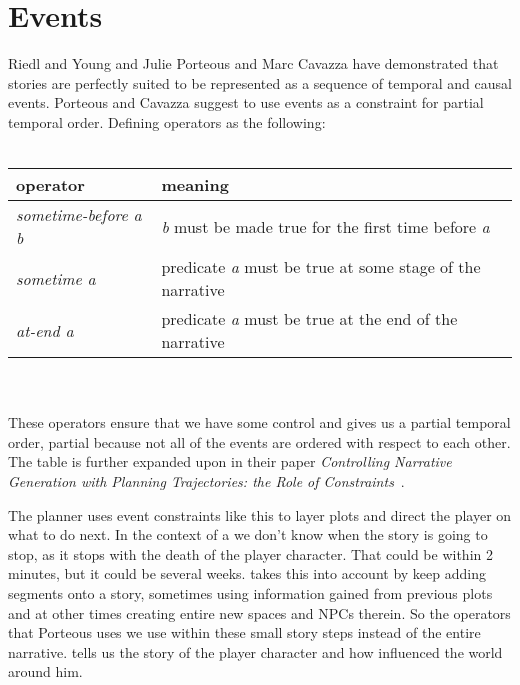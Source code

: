 \section{Events}
Riedl and Young\cite{Riedl:2004:IPM:1018409.1018753} and Julie Porteous and Marc Cavazza\cite{Porteous:2009:CNG:1695522.1695557} have demonstrated that stories are perfectly suited to be represented as a sequence of temporal and causal events.
Porteous and Cavazza suggest to use events as a constraint for partial temporal order.
Defining operators as the following:\\\\
\begin{tabular}{|l||l|}
\hline 
operator & meaning \\ 
\hline
\hline 
\textit{sometime-before a b} & \textit{b} must be made true for the first time before \textit{a} \\ 
\hline 
\textit{sometime a} & predicate \textit{a} must be true at some stage of the narrative \\ 
\hline 
\textit{at-end a} & predicate \textit{a} must be true at the end of the narrative \\ 
\hline 
\end{tabular} 
\\\\
These operators ensure that we have some control and gives us a partial temporal order, partial because not all of the events are ordered with respect to each other.
The table is further expanded upon in their paper \textit{Controlling Narrative Generation with Planning Trajectories: the Role of Constraints}~\cite{Porteous:2009:CNG:1695522.1695557}.

The \diage planner uses event constraints like this to layer plots and direct the player on what to do next.
In the context of a \rogue we don't know when the story is going to stop, as it stops with the death of the player character.
That could be within 2 minutes, but it could be several weeks.
\diage takes this into account by keep adding segments onto a story, sometimes using information gained from previous plots and at other times creating entire new spaces and NPCs therein.
So the operators that Porteous uses we use within these small story steps instead of the entire narrative.
\diage tells us the story of the player character and how \he influenced the world around him.

